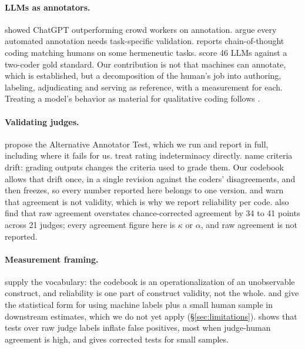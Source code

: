 \documentclass[11pt]{article}
\begin{document}
\paragraph{LLMs as annotators.} \citet{gilardi2023chatgpt} showed ChatGPT outperforming crowd
workers on annotation. \citet{pangakis2023validation} argue every automated annotation needs
task-specific validation. \citet{dunivin2024scalable} reports chain-of-thought coding matching
humans on some hermeneutic tasks. \citet{marston2026fortysix} score 46 LLMs against a two-coder
gold standard. Our contribution is not that machines can annotate, which is established, but a
decomposition of the human's job into authoring, labeling, adjudicating and serving as reference,
with a measurement for each. Treating a model's behavior as material for qualitative coding follows
\citet{jarrahi2025interviewing}.

\paragraph{Validating judges.} \citet{calderon2025alttest} propose the Alternative Annotator Test,
which we run and report in full, including where it fails for us. \citet{guerdan2025indeterminacy}
treat rating indeterminacy directly. \citet{shankar2024evalgen} name criteria drift: grading
outputs changes the criteria used to grade them. Our codebook allows that drift once, in a single
revision against the coders' disagreements, and then freezes, so every number reported here
belongs to one version. \citet{norman2026reliability} and \citet{liu2026agreement}
warn that agreement is not validity, which is why we report reliability per code. \citeauthor{norman2026reliability} also find that raw
agreement overstates chance-corrected agreement by 34 to 41 points across 21 judges; every
agreement figure here is $\kappa$ or $\alpha$, and raw agreement is not reported.

\paragraph{Measurement framing.} \citet{jacobs2021measurement} supply the vocabulary: the codebook
is an operationalization of an unobservable construct, and reliability is one part of construct
validity, not the whole. \citet{egami2023dsl} and \citet{angelopoulos2023ppi} give the statistical
form for using machine labels plus a small human sample in downstream estimates, which we do not yet apply (\S\ref{sec:limitations}). \citet{arawjo2026evalstats} shows that tests over raw judge labels
inflate false positives, most when judge-human agreement is high, and gives corrected tests for
small samples.
\end{document}
